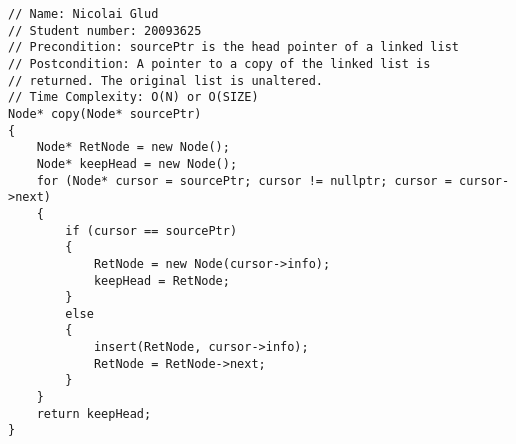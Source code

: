 
\raggedbottom

{}
\begin{lstlisting}
// Name: Nicolai Glud
// Student number: 20093625
// Precondition: sourcePtr is the head pointer of a linked list
// Postcondition: A pointer to a copy of the linked list is
// returned. The original list is unaltered.
// Time Complexity: O(N) or O(SIZE)
Node* copy(Node* sourcePtr)
{
	Node* RetNode = new Node();
	Node* keepHead = new Node();
	for (Node* cursor = sourcePtr; cursor != nullptr; cursor = cursor->next)
	{
		if (cursor == sourcePtr)
		{
			RetNode = new Node(cursor->info);
			keepHead = RetNode;
		}
		else
		{
			insert(RetNode, cursor->info);
			RetNode = RetNode->next;
		}
	}
	return keepHead;
}
\end{lstlisting}

